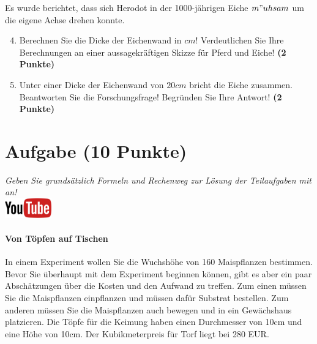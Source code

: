 \documentclass[a4paper, 9pt]{scrartcl}\usepackage[]{graphicx}\usepackage[]{xcolor}
\begin{document}
Es wurde berichtet, dass sich Herodot in der 1000-j{\"a}hrigen Eiche
$m{"u}hsam$ um die eigene Achse drehen konnte.

\begin{enumerate}
  \setcounter{enumi}{3}
\item Berechnen Sie die Dicke der Eichenwand in $cm$! Verdeutlichen Sie Ihre
  Berechnungen an einer aussagekr{\"a}ftigen Skizze f{\"u}r Pferd und Eiche! \textbf{(2 Punkte)} 
\item Unter einer Dicke der Eichenwand von $20cm$ bricht
  die Eiche zusammen. Beantworten Sie die Forschungsfrage! Begr{\"u}nden Sie
  Ihre Antwort! \textbf{(2 Punkte)} 
\end{enumerate}
 
\clearpage

\section{Aufgabe \hfill (10 Punkte)}

\textit{Geben Sie grunds{\"a}tzlich Formeln und Rechenweg zur L{\"o}sung der
  Teilaufgaben mit an!} \\[1Ex]

\hfill\href{https://youtu.be/57B-yYoFSk0}{\includegraphics[width =
  2cm]{img/youtube}} %
\hspace{2Ex}

\paragraph{Von T{\"o}pfen auf Tischen}



In einem Experiment wollen Sie die Wuchsh{\"o}he von 160
Maispflanzen bestimmen. Bevor Sie {\"u}berhaupt mit dem Experiment beginnen
k{\"o}nnen, gibt es aber ein paar Absch{\"a}tzungen {\"u}ber die Kosten und den Aufwand
zu treffen. Zum einen m{\"u}ssen Sie die Maispflanzen einpflanzen und m{\"u}ssen
daf{\"u}r Substrat bestellen. Zum anderen m{\"u}ssen Sie die Maispflanzen auch
bewegen und in ein Gew{\"a}chshaus platzieren. Die T{\"o}pfe f{\"u}r die Keimung haben
einen Durchmesser von 10cm und eine H{\"o}he von 10cm. Der
Kubikmeterpreis f{\"u}r Torf liegt bei 280 EUR.
\end{document}
